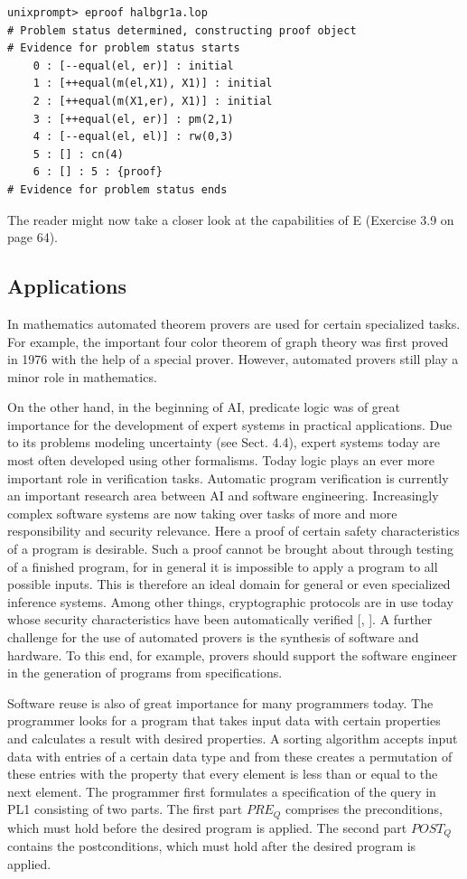 \documentclass[10pt]{book}
\begin{document}
\begin{verbatim}
unixprompt> eproof halbgr1a.lop
# Problem status determined, constructing proof object
# Evidence for problem status starts
    0 : [--equal(el, er)] : initial
    1 : [++equal(m(el,X1), X1)] : initial
    2 : [++equal(m(X1,er), X1)] : initial
    3 : [++equal(el, er)] : pm(2,1)
    4 : [--equal(el, el)] : rw(0,3)
    5 : [] : cn(4)
    6 : [] : 5 : {proof}
# Evidence for problem status ends
\end{verbatim}

The reader might now take a closer look at the capabilities of E (Exercise 3.9 on page 64).

\subsection{Applications}
In mathematics automated theorem provers are used for certain specialized tasks. For example, the important four color theorem of graph theory was first proved in 1976 with the help of a special prover. However, automated provers still play a minor role in mathematics.

On the other hand, in the beginning of AI, predicate logic was of great importance for the development of expert systems in practical applications. Due to its problems modeling uncertainty (see Sect. 4.4), expert systems today are most often developed using other formalisms.
Today logic plays an ever more important role in verification tasks. Automatic program verification is currently an important research area between AI and software engineering. Increasingly complex software systems are now taking over tasks of more and more responsibility and security relevance. Here a proof of certain safety characteristics of a program is desirable. Such a proof cannot be brought about through testing of a finished program, for in general it is impossible to apply a program to all possible inputs. This is therefore an ideal domain for general or even specialized inference systems. Among other things, cryptographic protocols are in use today whose security characteristics have been automatically verified [\cite{fs97}, \cite{sch01}]. A further challenge for the use of automated provers is the synthesis of software and hardware. To this end, for example, provers should support the software engineer in the generation of programs from specifications.

Software reuse is also of great importance for many programmers today. The programmer looks for a program that takes input data with certain properties and calculates a result with desired properties. A sorting algorithm accepts input data with entries of a certain data type and from these creates a permutation of these entries with the property that every element is less than or equal to the next element. The programmer first formulates a specification of the query in PL1 consisting of two parts. The first part $P R E_{Q}$ comprises the preconditions, which must hold before the desired program is applied. The second part $P O S T_{Q}$ contains the postconditions, which must hold after the desired program is applied.
\end{document}
